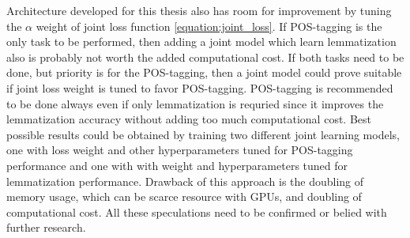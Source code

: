 \documentclass[12pt,a4paper,english
]{tutthesis}
\begin{document}
Architecture developed for this thesis also has room for improvement by tuning the $\alpha$ weight of joint loss function \ref{equation:joint_loss}. If POS-tagging is the only task to be performed, then adding a joint model which learn lemmatization also is probably not worth the added computational cost. If both tasks need to be done, but priority is for the POS-tagging, then a joint model could prove suitable if joint loss weight is tuned to favor POS-tagging. POS-tagging is recommended to be done always even if only lemmatization is requried since it improves the lemmatization accuracy without adding too much computational cost. Best possible results could be obtained by training two different joint learning models, one with loss weight and other hyperparameters tuned for POS-tagging performance and one with with weight and hyperparameters tuned for lemmatization performance. Drawback of this approach is the doubling of memory usage, which can be scarce resource with GPUs, and doubling of computational cost. All these speculations need to be confirmed or belied with further research.

%
%
\newpage



\renewcommand{\bibname}{Bibliography}     %
\addcontentsline{toc}{chapter}{\bibname}  %


\printbibliography                  %
\end{document}
